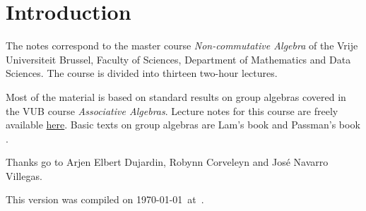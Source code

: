 \section*{Introduction}

The notes correspond to the master  
course \emph{Non-commutative Algebra} of the 
Vrije Universiteit Brussel, 
Faculty of Sciences, 
Department of Mathematics and Data Sciences. The course
is divided into thirteen two-hour lectures. 

Most of the material is based on standard 
results on group algebras covered in the VUB course \emph{Associative Algebras}. Lecture  
notes for this course are freely available  
\href{https://github.com/vendramin/associative}{here}. 
Basic texts on group algebras are Lam's book \cite{MR1125071}
and Passman's book \cite{MR798076}.

 
Thanks go to Arjen Elbert Dujardin, Robynn Corveleyn and
José Navarro Villegas. 

This version 
was compiled on \today~at~\currenttime.

